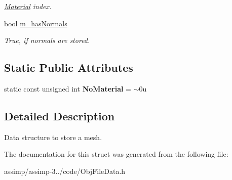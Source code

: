 \begin{DoxyCompactItemize}
\begin{DoxyCompactList}\small\item\em \hyperlink{struct_assimp_1_1_obj_file_1_1_material}{Material} index. \end{DoxyCompactList}\item 
\hypertarget{struct_assimp_1_1_obj_file_1_1_mesh_aa1970ee9d4d0328c7d256f80c95d1f0c}{bool \hyperlink{struct_assimp_1_1_obj_file_1_1_mesh_aa1970ee9d4d0328c7d256f80c95d1f0c}{m\+\_\+has\+Normals}}\label{struct_assimp_1_1_obj_file_1_1_mesh_aa1970ee9d4d0328c7d256f80c95d1f0c}

\begin{DoxyCompactList}\small\item\em True, if normals are stored. \end{DoxyCompactList}\end{DoxyCompactItemize}
\subsection*{Static Public Attributes}
\begin{DoxyCompactItemize}
\item 
\hypertarget{struct_assimp_1_1_obj_file_1_1_mesh_aa10d0b5085c4bc1a47fb98d3bd9a4fcf}{static const unsigned int {\bfseries No\+Material} = $\sim$0u}\label{struct_assimp_1_1_obj_file_1_1_mesh_aa10d0b5085c4bc1a47fb98d3bd9a4fcf}

\end{DoxyCompactItemize}


\subsection{Detailed Description}
Data structure to store a mesh. 

The documentation for this struct was generated from the following file\+:\begin{DoxyCompactItemize}
\item 
assimp/assimp-\/3../code/Obj\+File\+Data.\+h\end{DoxyCompactItemize}
